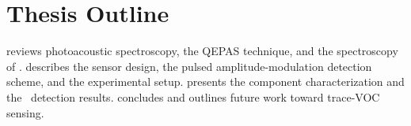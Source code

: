 \section{Thesis Outline}
\label{sec:outline}

 reviews photoacoustic spectroscopy, the QEPAS technique, and the spectroscopy of \nto.  describes the sensor design, the pulsed amplitude-modulation detection scheme, and the experimental setup.  presents the component characterization and the \nto\ detection results.  concludes and outlines future work toward trace-VOC sensing.
